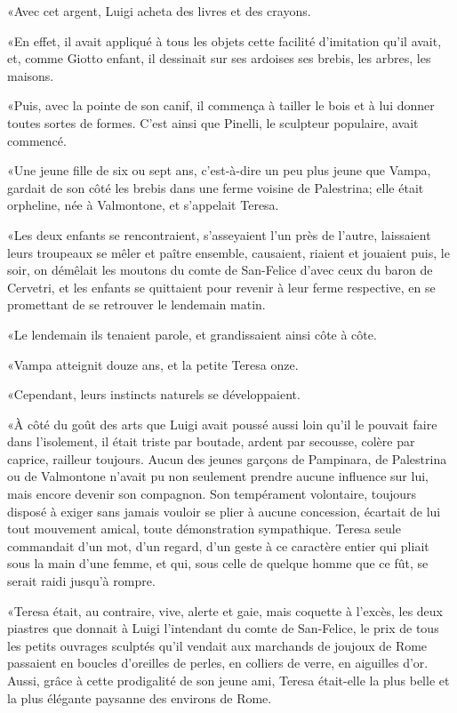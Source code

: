 «Avec cet argent, Luigi acheta des livres et des crayons. 

«En effet, il avait appliqué à tous les objets cette facilité d'imitation qu'il avait, et, comme Giotto enfant, il dessinait sur ses ardoises ses brebis, les arbres, les maisons. 

«Puis, avec la pointe de son canif, il commença à tailler le bois et à lui donner toutes sortes de formes. C'est ainsi que Pinelli, le sculpteur populaire, avait commencé. 

«Une jeune fille de six ou sept ans, c'est-à-dire un peu plus jeune que Vampa, gardait de son côté les brebis dans une ferme voisine de Palestrina; elle était orpheline, née à Valmontone, et s'appelait Teresa. 

«Les deux enfants se rencontraient, s'asseyaient l'un près de l'autre, laissaient leurs troupeaux se mêler et paître ensemble, causaient, riaient et jouaient puis, le soir, on démêlait les moutons du comte de San-Felice d'avec ceux du baron de Cervetri, et les enfants se quittaient pour revenir à leur ferme respective, en se promettant de se retrouver le lendemain matin. 

«Le lendemain ils tenaient parole, et grandissaient ainsi côte à côte. 

«Vampa atteignit douze ans, et la petite Teresa onze. 

«Cependant, leurs instincts naturels se développaient. 

«À côté du goût des arts que Luigi avait poussé aussi loin qu'il le pouvait faire dans l'isolement, il était triste par boutade, ardent par secousse, colère par caprice, railleur toujours. Aucun des jeunes garçons de Pampinara, de Palestrina ou de Valmontone n'avait pu non seulement prendre aucune influence sur lui, mais encore devenir son compagnon. Son tempérament volontaire, toujours disposé à exiger sans jamais vouloir se plier à aucune concession, écartait de lui tout mouvement amical, toute démonstration sympathique. Teresa seule commandait d'un mot, d'un regard, d'un geste à ce caractère entier qui pliait sous la main d'une femme, et qui, sous celle de quelque homme que ce fût, se serait raidi jusqu'à rompre. 

«Teresa était, au contraire, vive, alerte et gaie, mais coquette à l'excès, les deux piastres que donnait à Luigi l'intendant du comte de San-Felice, le prix de tous les petits ouvrages sculptés qu'il vendait aux marchands de joujoux de Rome passaient en boucles d'oreilles de perles, en colliers de verre, en aiguilles d'or. Aussi, grâce à cette prodigalité de son jeune ami, Teresa était-elle la plus belle et la plus élégante paysanne des environs de Rome. 


